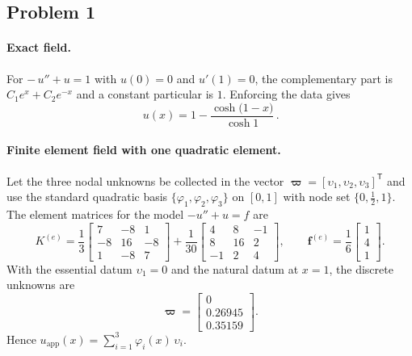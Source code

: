 \documentclass[12pt,a4paper]{article}
\begin{document}
\subsection*{Problem 1}
\paragraph{Exact field.}
For
\(
-\,u''+u=1
\)
with $u(0)=0$ and $u'(1)=0$, the complementary part is $C_1 e^{x}+C_2 e^{-x}$ and a constant particular is $1$. Enforcing the data gives
\[
\boxed{\,u(x)=1-\dfrac{\cosh\!\big(1-x\big)}{\cosh 1}\, }.
\]

\paragraph{Finite element field with one quadratic element.}
Let the three nodal unknowns be collected in the vector $\boldsymbol{\varpi}=[\upsilon_1,\upsilon_2,\upsilon_3]^{\mathsf{T}}$ and use the standard quadratic basis $\{\varphi_1,\varphi_2,\varphi_3\}$ on $[0,1]$ with node set $\{0,\tfrac12,1\}$. The element matrices for the model $-u''+u=f$ are
\[
K^{(e)}=\frac{1}{3}
\begin{bmatrix}
7&-8&1\\
-8&16&-8\\
1&-8&7
\end{bmatrix}
+\frac{1}{30}
\begin{bmatrix}
4&8&-1\\
8&16&2\\
-1&2&4
\end{bmatrix},
\qquad
\boldsymbol{f}^{(e)}=\frac{1}{6}\begin{bmatrix}1\\4\\1\end{bmatrix}.
\]
With the essential datum $\upsilon_1=0$ and the natural datum at $x=1$, the discrete unknowns are
\[
\boldsymbol{\varpi}=
\begin{bmatrix}
0\\[2pt]
0.26945\\[2pt]
0.35159
\end{bmatrix}.
\]
Hence
\(
u_{\mathrm{app}}(x)=\sum_{i=1}^{3}\varphi_i(x)\,\upsilon_i
\).
\end{document}

